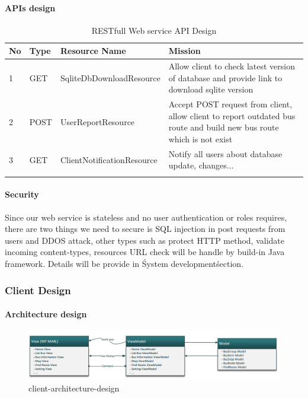 		\paragraph{APIs design}
			\begin{center}
			\begin{longtable}{|p{1cm}|p{2cm}|p{5cm}|p{6cm}|} 
				\hline
				\bfseries No & \bfseries Type & \bfseries Resource Name & \bfseries Mission \\ 
				\hline
				\hline
				1 & GET & SqliteDbDownloadResource & Allow client to check latest version of database and provide link to download sqlite version \\
				\hline
				2 & POST & UserReportResource & Accept POST request from client, allow client to report outdated bus route and build new bus route which is not exist \\
				\hline
				3 & GET & ClientNotificationResource & Notify all users about database update, changes... \\
				\hline
				\caption{RESTfull Web service API Design} 
				\label{table:RESTfull_Web_service_API_Design} 
			\end{longtable}
			\end{center}
		\paragraph{Security}
		Since our web service is stateless and no user authentication or roles requires, there are two things we need to secure is SQL injection in post requests from users and DDOS attack, other types such as protect HTTP method, validate incoming content-types, resources URL check will be handle by build-in Java framework. Details will be provide in \'System development\' section.
		
	\subsubsection{Client Design}
		\paragraph{Architecture design}
			\begin{figure}[H]
				\centering
				\includegraphics[scale=0.5]{Chapters/Fig/client-architecture-design.png}
				\caption{client-architecture-design}
				\label{fig:architecture-of-webservice}
			\end{figure}
